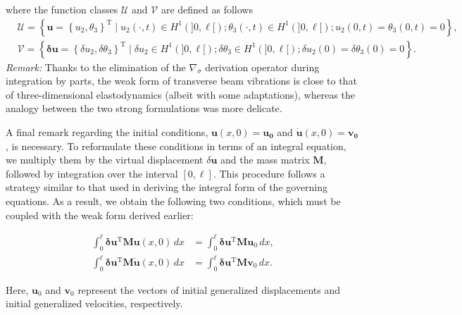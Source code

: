 \documentclass[12pt]{article}
\begin{document}
where the function classes $\mathcal U$ and $\mathcal V$ are defined as follows
$$
    \begin{aligned}
         & \mathcal U=\left\{\mathbf{u}=\left\{u_2, \theta_3\right\}^{\mathrm{T}} \mid u_2(\cdot,t) \in H^1(] 0, \ell[) ; \theta_3(\cdot,t) \in H^1(] 0, \ell[) ; u_2(0, t)=\theta_3(0, t)=0\right\},                                     \\
         & \mathcal V=\left\{\boldsymbol\delta \mathbf{u}=\left\{\delta u_2, \delta \theta_3\right\}^{\mathrm{T}} \mid \delta u_2 \in H^1(] 0, \ell[) ; \delta \theta_3 \in H^1(] 0, \ell[) ; \delta u_2(0)=\delta \theta_3(0)=0\right\}.
    \end{aligned}
$$
\emph{Remark:} Thanks to the elimination of the $\nabla_\sigma$ derivation operator during integration by parts, the weak form of transverse beam vibrations is close to that of three-dimensional elastodynamics (albeit with some adaptations), whereas the analogy between the two strong formulations was more delicate.

A final remark regarding the initial conditions, \( \mathbf{u}(x,0) = \mathbf{u_0} \) and \( \dot{\mathbf{u}}(x,0) = \mathbf{v_0} \), is necessary. To reformulate these conditions in terms of an integral equation, we multiply them by the virtual displacement \( \delta \mathbf{u} \) and the mass matrix \( \mathbf{M} \), followed by integration over the interval \( [0,\ell] \). This procedure follows a strategy similar to that used in deriving the integral form of the governing equations. As a result, we obtain the following two conditions, which must be coupled with the weak form derived earlier:

\begin{align*}
    \int_0^{\ell} \boldsymbol\delta \mathbf{u}^{\mathrm{T}} \mathbf{M} \mathbf{u} (x,0)\, d x      & = \int_0^{\ell} \boldsymbol\delta \mathbf{u}^{\mathrm{T}} \mathbf{M} \mathbf{u}_0\, dx,  \\
    \int_0^{\ell} \boldsymbol\delta \mathbf{u}^{\mathrm{T}} \mathbf{M} \dot{\mathbf{u}}(x,0)\, d x & = \int_0^{\ell} \boldsymbol\delta \mathbf{u}^{\mathrm{T}} \mathbf{M} \mathbf{v}_0 \, dx.
\end{align*}

Here, \( \mathbf{u}_0 \) and \( \mathbf{v}_0 \) represent the vectors of initial generalized displacements and initial generalized velocities, respectively.
\end{document}
